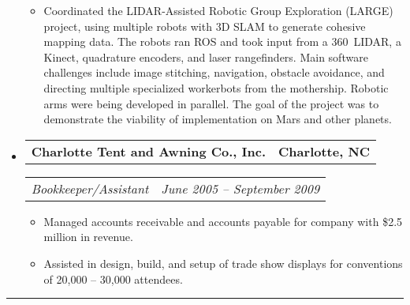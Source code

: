 \documentclass[10pt,letterpaper]{article}
\makeatletter
\newcommand{\headerrow}[2]
{\begin{tabular*}{\linewidth}{l@{\extracolsep{\fill}}r}
	#1 & #2 \\
\end{tabular*}}
\makeatother
\begin{document}
\begin{itemize}
\begin{itemize}
        \item Coordinated the LIDAR-Assisted Robotic Group Exploration (LARGE)
            project, using multiple robots with 3D SLAM to generate cohesive
            mapping data.  The robots ran ROS and took input from a 360\degree\
            LIDAR, a Kinect, quadrature encoders, and laser rangefinders.  Main
            software challenges include image stitching, navigation, obstacle
            avoidance, and directing multiple specialized workerbots from the
            mothership.  Robotic arms were being developed in parallel.  The
            goal of the project was to demonstrate the viability of
            implementation on Mars and other planets.
	\end{itemize}

	\item
	\headerrow
		{\textbf{Charlotte Tent and Awning Co., Inc.}}
		{\textbf{Charlotte, NC}}
	\headerrow
		{\emph{Bookkeeper/Assistant}}
		{\emph{June 2005 -- September 2009}}
	\begin{itemize}
        \item Managed accounts receivable and accounts payable for company with
            \$2.5 million in revenue.

        \item Assisted in design, build, and setup of trade show displays for
            conventions of 20,000 -- 30,000 attendees.
	\end{itemize}

\end{itemize}

\hrule
\vspace{-0.4em}
\end{document}
